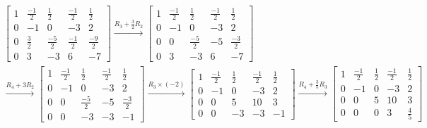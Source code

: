 \documentclass{article}
\begin{document}
\begin{align*}
\begin{bmatrix}
    1 & \frac{-1}{2} & \frac{1}{2}  & \frac{-1}{2} & \frac{1}{2}  \\
    0 & -1           & 0            & -3           & 2            \\
    0 & \frac{3}{2}  & \frac{-5}{2} & \frac{-1}{2} & \frac{-9}{2} \\
    0 & 3            & -3           & 6            & -7
  \end{bmatrix}
  \xrightarrow{R_3 + \frac{3}{2} R_2}
  \begin{bmatrix}
    1 & \frac{-1}{2} & \frac{1}{2}  & \frac{-1}{2} & \frac{1}{2}  \\
    0 & -1           & 0            & -3           & 2            \\
    0 & 0            & \frac{-5}{2} & -5           & \frac{-3}{2} \\
    0 & 3            & -3           & 6            & -7
  \end{bmatrix} \\
  \xrightarrow{R_4 + 3 R_2}
  \begin{bmatrix}
    1 & \frac{-1}{2} & \frac{1}{2}  & \frac{-1}{2} & \frac{1}{2}  \\
    0 & -1           & 0            & -3           & 2            \\
    0 & 0            & \frac{-5}{2} & -5           & \frac{-3}{2} \\
    0 & 0            & -3           & -3           & -1
  \end{bmatrix}
  \xrightarrow{R_3 \times (-2)}
  \begin{bmatrix}
    1 & \frac{-1}{2} & \frac{1}{2} & \frac{-1}{2} & \frac{1}{2} \\
    0 & -1           & 0           & -3           & 2           \\
    0 & 0            & 5           & 10           & 3           \\
    0 & 0            & -3          & -3           & -1
  \end{bmatrix}
  \xrightarrow{R_4 + \frac{3}{5} R_3}
  \begin{bmatrix}
    1 & \frac{-1}{2} & \frac{1}{2} & \frac{-1}{2} & \frac{1}{2} \\
    0 & -1           & 0           & -3           & 2           \\
    0 & 0            & 5           & 10           & 3           \\
    0 & 0            & 0           & 3            & \frac{4}{5}
  \end{bmatrix}
\end{align*}
\end{document}
